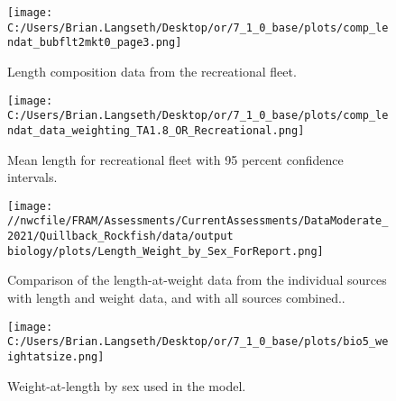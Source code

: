 \documentclass[11pt,
  english,
  a4paper,
]{article}
\begin{document}
\tagmcend\tagstructend


\begin{figure}
\centering
\texttt{[image: C:/Users/Brian.Langseth/Desktop/or/7\_1\_0\_base/plots/comp\_lendat\_bubflt2mkt0\_page3.png]}
\caption{Length composition data from the recreational fleet.\label{fig:rec-len-data}}
\end{figure}

\tagmcend\tagstructend


\begin{figure}
\centering
\texttt{[image: C:/Users/Brian.Langseth/Desktop/or/7\_1\_0\_base/plots/comp\_lendat\_data\_weighting\_TA1.8\_OR\_Recreational.png]}
\caption{Mean length for recreational fleet with 95 percent confidence intervals.\label{fig:mean-rec-len-data}}
\end{figure}

\tagmcend\tagstructend


\begin{figure}
\centering
\texttt{[image: //nwcfile/FRAM/Assessments/CurrentAssessments/DataModerate\_2021/Quillback\_Rockfish/data/output biology/plots/Length\_Weight\_by\_Sex\_ForReport.png]}
\caption{Comparison of the length-at-weight data from the individual sources with length and weight data, and with all sources combined..\label{fig:len-weight-survey}}
\end{figure}

\tagmcend\tagstructend


\begin{figure}
\centering
\texttt{[image: C:/Users/Brian.Langseth/Desktop/or/7\_1\_0\_base/plots/bio5\_weightatsize.png]}
\caption{Weight-at-length by sex used in the model.\label{fig:len-weight}}
\end{figure}
\end{document}
